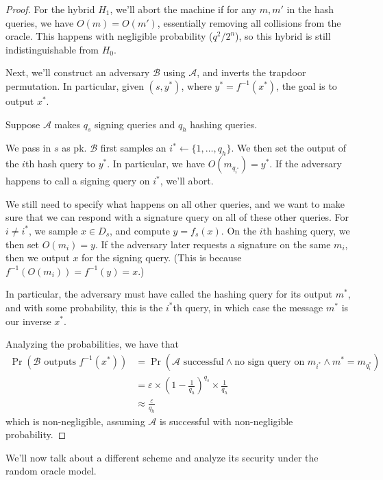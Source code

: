 \begin{proof}
    For the hybrid $H_1$, we'll abort the machine if for any $m, m'$ in the hash queries, we have $O(m) = O(m')$, essentially removing all collisions from the oracle. This happens with negligible probability ($q^2 / 2^n$), so this hybrid is still indistinguishable from $H_0$.

    Next, we'll construct an adversary $\mathcal{B}$ using $\mathcal{A}$, and inverts the trapdoor permutation. In particular, given $(s, y^*)$, where $y^* = f^{-1}(x^*)$, the goal is to output $x^*$.

    Suppose $\mathcal{A}$ makes $q_s$ signing queries and $q_h$ hashing queries.

    We pass in $s$ as $\mathrm{pk}$. $\mathcal{B}$ first samples an $i^* \gets \{1, \ldots, q_h\}$. We then set the output of the $i$th hash query to $y^*$. In particular, we have $O(m_{q_{i^*}}) = y^*$. If the adversary happens to call a signing query on $i^*$, we'll abort.

    We still need to specify what happens on all other queries, and we want to make sure that we can respond with a signature query on all of these other queries. For $i \ne i^*$, we sample $x \in D_s$, and compute $y = f_s(x)$. On the $i$th hashing query, we then set $O(m_i) = y$. If the adversary later requests a signature on the same $m_i$, then we output $x$ for the signing query. (This is because $f^{-1}(O(m_i)) = f^{-1}(y) = x$.)

    In particular, the adversary must have called the hashing query for its output $m^*$, and with some probability, this is the $i^*$th query, in which case the message $m^*$ is our inverse $x^*$.

    Analyzing the probabilities, we have that
    \begin{align*}
        \Pr(\text{$\mathcal{B}$ outputs $f^{-1}(x^*)$})
            &= \Pr(\text{$\mathcal{A}$ successful} \land \text{no sign query on $m_{i^*}$} \land m^* = m_{q_i^*}) \\
            &= \varepsilon \times \left(1 - \frac{1}{q_h}\right)^{q_s} \times \frac{1}{q_h} \\
            &\approx \frac{\varepsilon}{q_h}
    \end{align*}
    which is non-negligible, assuming $\mathcal{A}$ is successful with non-negligible probability.
\end{proof}

We'll now talk about a different scheme and analyze its security under the random oracle model.

